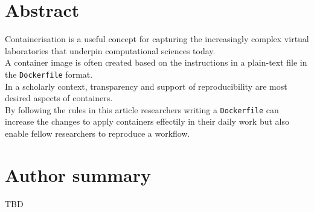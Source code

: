 \documentclass[10pt,letterpaper]{article}
\newcommand{\getIndex}[2]{
  \ForEach{,}{\IfEq{#1}{\thislevelitem}{\number\thislevelcount\ExitForEach}{}}{#2}
}
\newcommand{\getAff}[1]{
  \getIndex{#1}{}
}
\begin{document}
\vspace*{0.2in}

\section*{Abstract}
Containerisation is a useful concept for capturing the increasingly
complex virtual laboratories that underpin computational sciences
today.\\
A container image is often created based on the instructions in a
plain-text file in the \texttt{Dockerfile} format.\\
In a scholarly context, transparency and support of reproducibility are
most desired aspects of containers.\\
By following the rules in this article researchers writing a
\texttt{Dockerfile} can increase the changes to apply containers
effectily in their daily work but also enable fellow researchers to
reproduce a workflow.

\section*{Author summary}
TBD
\end{document}
